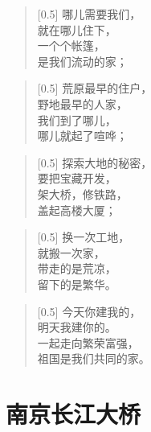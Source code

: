 \documentclass[12pt,UTF-8,openany]{ctexbook}
\begin{document}
\begin{large}
    
    \begin{verse}[0.5\linewidth]
        哪儿需要我们， \\
        就在哪儿住下， \\
        一个个帐篷， \\
        是我们流动的家；
    \end{verse}
    
    
    \begin{verse}[0.5\linewidth]
        荒原最早的住户， \\
        野地最早的人家， \\
        我们到了哪儿， \\
        哪儿就起了喧哗；
    \end{verse}
    
    
    \begin{verse}[0.5\linewidth]
        探索大地的秘密， \\
        要把宝藏开发， \\
        架大桥，修铁路， \\
        盖起高楼大厦；
    \end{verse}
    
    
    \begin{verse}[0.5\linewidth]
        换一次工地， \\
        就搬一次家， \\
        带走的是荒凉， \\
        留下的是繁华。
    \end{verse}
    
    
    \begin{verse}[0.5\linewidth]
        今天你建我的， \\
        明天我建你的。 \\
        一起走向繁荣富强， \\
        祖国是我们共同的家。
    \end{verse}
    
\end{large}



\chapter{南京长江大桥}
\end{document}
